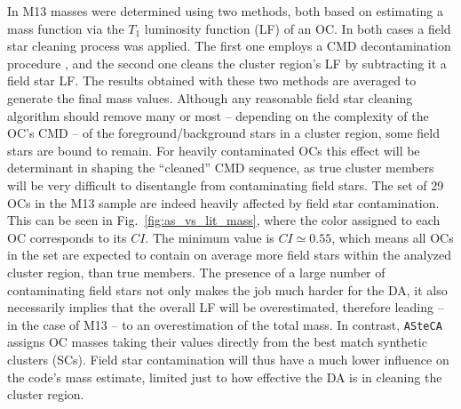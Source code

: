 \documentclass{aa}
\begin{document}
In M13 masses were determined using two methods, both based on estimating
a mass function via the $T_1$ luminosity function (LF) of an OC.\@
In both cases a field star cleaning process was applied. The first one employs
a CMD decontamination procedure \citep[described in][]{Maia_2010}, and the
second one cleans the cluster region's LF by subtracting it a field star LF.\@
The results obtained with these two methods are averaged to generate the final
mass values.
%
Although any reasonable field star cleaning algorithm should remove many or most
-- depending on the complexity of the OC's CMD -- of the foreground/background
stars in a cluster region, some field stars are bound to remain.
For heavily contaminated OCs this effect will be determinant in shaping the
``cleaned'' CMD sequence, as true cluster members will be very difficult to
disentangle from contaminating field stars.
%
The set of 29 OCs in the M13 sample are indeed heavily affected by field star
contamination. This can be seen in Fig.~\ref{fig:as_vs_lit_mass}, where the
color assigned to each OC corresponds to its $CI$. The minimum value is
$CI{\simeq}0.55$, which means all OCs in the set are expected to contain on 
average more field stars within the analyzed cluster region, than true members.
%
The presence of a large number of contaminating field stars not only makes the
job much harder for the DA, it also necessarily implies that the overall LF will
be overestimated, therefore leading -- in the case of M13 --  to an
overestimation of the total mass.
In contrast, \texttt{ASteCA} assigns OC masses taking their values directly from
the best match synthetic clusters (SCs). Field star contamination will thus have
a much lower influence on the code's mass estimate, limited just to how
effective the DA is in cleaning the cluster region.
\end{document}
